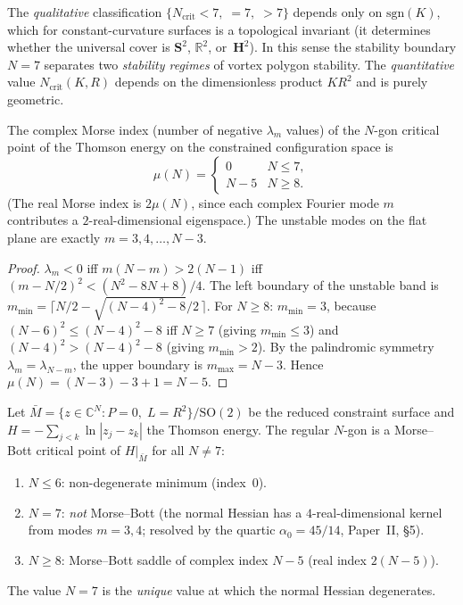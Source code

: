 The \emph{qualitative} classification
$\{N_{\mathrm{crit}} < 7,\; = 7,\; > 7\}$ depends only on
$\mathrm{sgn}(K)$, which for constant-curvature surfaces is a
topological invariant (it determines whether the universal cover
is $\mathbf{S}^2$, $\mathbb{R}^2$, or~$\mathbf{H}^2$).
In this sense the stability boundary $N = 7$ separates two
\emph{stability regimes} of vortex polygon stability.
The \emph{quantitative} value $N_{\mathrm{crit}}(K, R)$ depends
on the dimensionless product $K R^2$ and is purely geometric.
\begin{proposition}
\label{prop:morse-index}
The complex Morse index (number of negative $\lambda_m$ values)
of the $N$-gon critical point of the Thomson energy
on the constrained configuration space is
\[
  \mu(N) = \begin{cases} 0 & N \le 7, \\ N - 5 & N \ge 8. \end{cases}
\]
(The real Morse index is $2\mu(N)$, since each complex Fourier mode
$m$ contributes a $2$-real-dimensional eigenspace.)
The unstable modes on the flat plane are exactly $m = 3, 4, \ldots, N{-}3$.
\end{proposition}

\begin{proof}
$\lambda_m < 0$ iff $m(N{-}m) > 2(N{-}1)$ iff
$(m - N/2)^2 < (N^2 - 8N + 8)/4$.  The left boundary of the
unstable band is $m_{\min} = \lceil N/2 - \sqrt{(N{-}4)^2 - 8}/2\,\rceil$.
For $N \ge 8$: $m_{\min} = 3$, because
$(N{-}6)^2 \le (N{-}4)^2 - 8$ iff $N \ge 7$
(giving $m_{\min} \le 3$) and
$(N{-}4)^2 > (N{-}4)^2 - 8$
(giving $m_{\min} > 2$).
By the palindromic symmetry $\lambda_m = \lambda_{N-m}$, the
upper boundary is $m_{\max} = N - 3$.
Hence $\mu(N) = (N{-}3) - 3 + 1 = N - 5$.
\end{proof}

\begin{theorem}
\label{thm:morse-bott}
Let $\bar{M} = \{z \in \mathbb{C}^N : P{=}0,\; L{=}R^2\}/\mathrm{SO}(2)$
be the reduced constraint surface and $H = -\sum_{j<k}\ln|z_j - z_k|$
the Thomson energy.
The regular $N$-gon is a Morse--Bott critical point of $H|_{\bar{M}}$
for all $N \ne 7$:
\begin{enumerate}
\item $N \le 6$: non-degenerate minimum (index~$0$).
\item $N = 7$: \emph{not} Morse--Bott (the normal Hessian
  has a $4$-real-dimensional kernel from modes $m = 3, 4$;
  resolved by the quartic $\alpha_0 = 45/14$,
  Paper~II, \S5).
\item $N \ge 8$: Morse--Bott saddle of complex index $N{-}5$
  (real index $2(N{-}5)$).
\end{enumerate}
The value $N = 7$ is the \emph{unique} value at which the
normal Hessian degenerates.
\end{theorem}

